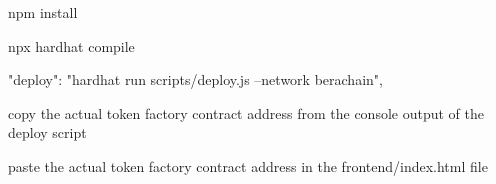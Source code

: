 npm install

npx hardhat compile

"deploy": "hardhat run scripts/deploy.js --network berachain",

copy the actual token factory contract address from the console output of the deploy script

paste the actual token factory contract address in the frontend/index.html file
